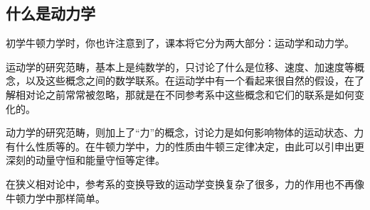 




\subsection{什么是动力学}
初学牛顿力学时，你也许注意到了，课本将它分为两大部分：运动学和动力学。

运动学的研究范畴，基本上是纯数学的，只讨论了什么是位移、速度、加速度等概念，以及这些概念之间的数学联系。在运动学中有一个看起来很自然的假设，在了解相对论之前常常被忽略，那就是在不同参考系中这些概念和它们的联系是如何变化的。

动力学的研究范畴，则加上了“力”的概念，讨论力是如何影响物体的运动状态、力有什么性质等的。在牛顿力学中，力的性质由牛顿三定律决定，由此可以引申出更深刻的动量守恒和能量守恒等定律。

在狭义相对论中，参考系的变换导致的运动学变换复杂了很多，力的作用也不再像牛顿力学中那样简单。

